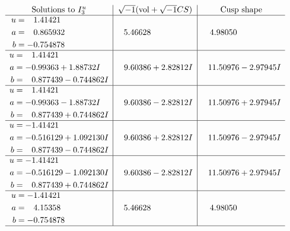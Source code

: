 \documentclass[1p]{elsarticle_modified}
\theoremstyle{definition}
\newcommand{\I}{\sqrt{-1}}
\begin{document}
$$\begin{array}{c|c|c}  
\text{Solutions to }I^u_{3}& \I (\text{vol} + \sqrt{-1}CS) & \text{Cusp shape}\\
 \hline 
\begin{aligned}
u &= \phantom{-}1.41421\phantom{ +0.000000I} \\
a &= \phantom{-}0.865932\phantom{ +0.000000I} \\
b &= -0.754878\phantom{ +0.000000I}\end{aligned}
 & \phantom{-}5.46628\phantom{ +0.000000I} & \phantom{-}4.98050\phantom{ +0.000000I} \\ \hline\begin{aligned}
u &= \phantom{-}1.41421\phantom{ +0.000000I} \\
a &= -0.99363 + 1.88732 I \\
b &= \phantom{-}0.877439 - 0.744862 I\end{aligned}
 & \phantom{-}9.60386 + 2.82812 I & \phantom{-}11.50976 - 2.97945 I \\ \hline\begin{aligned}
u &= \phantom{-}1.41421\phantom{ +0.000000I} \\
a &= -0.99363 - 1.88732 I \\
b &= \phantom{-}0.877439 + 0.744862 I\end{aligned}
 & \phantom{-}9.60386 - 2.82812 I & \phantom{-}11.50976 + 2.97945 I \\ \hline\begin{aligned}
u &= -1.41421\phantom{ +0.000000I} \\
a &= -0.516129 + 1.092130 I \\
b &= \phantom{-}0.877439 - 0.744862 I\end{aligned}
 & \phantom{-}9.60386 + 2.82812 I & \phantom{-}11.50976 - 2.97945 I \\ \hline\begin{aligned}
u &= -1.41421\phantom{ +0.000000I} \\
a &= -0.516129 - 1.092130 I \\
b &= \phantom{-}0.877439 + 0.744862 I\end{aligned}
 & \phantom{-}9.60386 - 2.82812 I & \phantom{-}11.50976 + 2.97945 I \\ \hline\begin{aligned}
u &= -1.41421\phantom{ +0.000000I} \\
a &= \phantom{-}4.15358\phantom{ +0.000000I} \\
b &= -0.754878\phantom{ +0.000000I}\end{aligned}
 & \phantom{-}5.46628\phantom{ +0.000000I} & \phantom{-}4.98050\phantom{ +0.000000I}\\
 \hline 
 \end{array}$$\newpage\newpage\renewcommand{\arraystretch}{1}
\end{document}
